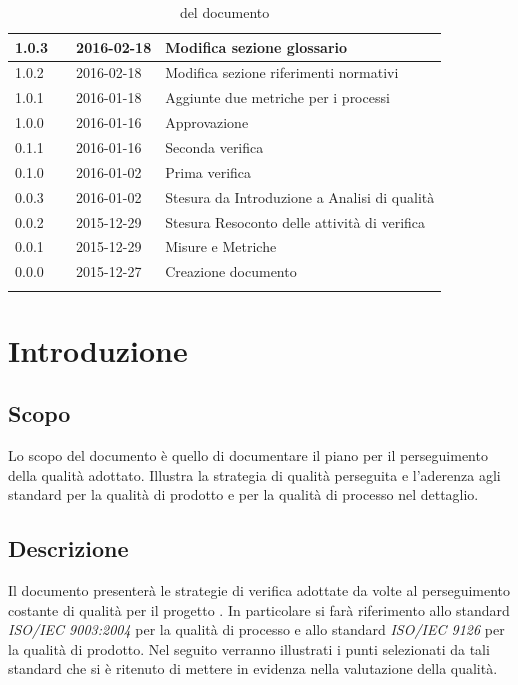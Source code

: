 \documentclass[12pt,a4paper]{article}
\begin{document}
\begin{center}
\begin{longtable}[H]{p{} p{} p{} p{}}
			\midrule
			1.0.3 & \AB{} & 2016-02-18 & Modifica sezione glossario  \\*
			\midrule
			1.0.2 & \AB{} & 2016-02-18 & Modifica sezione riferimenti normativi \\*
			\midrule
			1.0.1 & \AB{} & 2016-01-18 & Aggiunte due metriche per i processi \\*
			\midrule
			1.0.0 & \IB{} & 2016-01-16 & Approvazione \\*
			\midrule
			0.1.1 & \AVE{} & 2016-01-16 & Seconda verifica \\*
			\midrule
			0.1.0 & \NDC{} & 2016-01-02 & Prima verifica \\*
			\midrule
			0.0.3 & \AB{} & 2016-01-02 &  Stesura da Introduzione a Analisi di qualità\\*
			\midrule
			0.0.2 & \WS{} & 2015-12-29 &  Stesura Resoconto delle attività di verifica\\*
			\midrule
			0.0.1 & \AVI{} & 2015-12-29 &  Misure e Metriche \\*
			\midrule
			0.0.0 & \IB{} & 2015-12-27 &  Creazione documento \\*
			\bottomrule
			\caption{\mGls{versionamento}  del documento}
			\label{tabVers1}
		\end{longtable}
	\end{center}
	
	\newpage
	\tableofcontents
	\newpage
	\listoftables
	\listoffigures
	\newpage
	
	
	\section{Introduzione}	\label{intro}
	
	\subsection{Scopo}
	Lo scopo del documento è quello di documentare il piano per il perseguimento della qualità adottato. Illustra la strategia di qualità perseguita e l'aderenza agli standard per la qualità di prodotto e per la qualità di processo nel dettaglio. 
	
	\subsection{Descrizione}
	Il documento presenterà  le strategie di verifica adottate da \nomeGruppo{} volte al perseguimento costante di  qualità per il progetto \prjL{}. In particolare si farà riferimento allo standard \textit{ISO/IEC 9003:2004} per la qualità di processo e allo standard \textit{ISO/IEC 9126} per la qualità di prodotto. Nel seguito verranno illustrati i punti selezionati da tali standard che si è ritenuto di mettere in evidenza nella valutazione della qualità.
	
\end{document}
